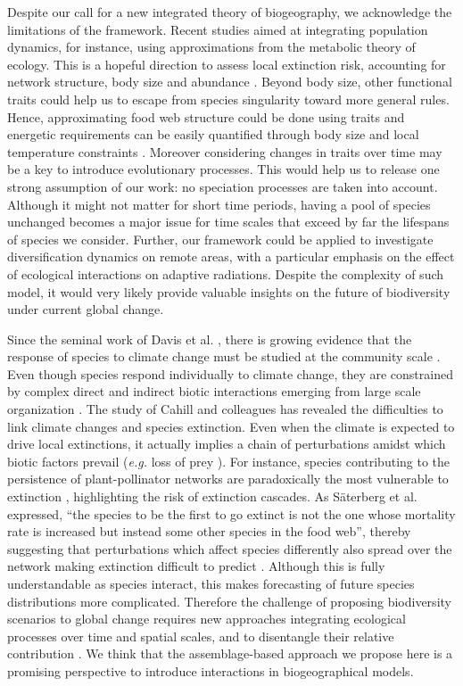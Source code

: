 Despite our call for a new integrated theory of biogeography, we acknowledge the limitations of the framework. Recent studies aimed at integrating population dynamics, for instance, using approximations from the metabolic theory of ecology. This is a hopeful direction to assess local extinction risk, accounting for network structure, body size and abundance \citep{Schneider2012Body}. Beyond body size, other functional traits \citep{Mcgill2006Rebuilding} could help us to escape from species singularity toward more general rules. Hence, approximating food web structure could be done using traits \citep{Gravel2013Inferring} and energetic requirements can be easily quantified through body size and local temperature constraints \citep{Brown2004Toward}. Moreover considering changes in traits over time may be a key to introduce evolutionary processes. This would help us to release one strong assumption of our work: no speciation processes are taken into account. Although it might not matter for short time periods, having a pool of species unchanged becomes a major issue for time scales that exceed by far the lifespans of species we consider. Further, our framework could be applied to investigate diversification dynamics on remote areas, with a particular emphasis on the effect of ecological interactions on adaptive radiations. Despite the complexity of such model, it would very likely provide valuable insights on the future of biodiversity under current global change.

Since the seminal work of Davis et al. \citep{Davis1998Making}, there is growing evidence that the response of species to climate change must be studied at the community scale \citep{Suttle2007Species}. Even though species respond individually to climate change, they are constrained by complex direct and indirect biotic interactions emerging from large scale organization \citep{Lavergne2010Biodiversity}. The study of Cahill and colleagues \citep{Cahill2013How} has revealed the difficulties to link climate changes and species extinction. Even when the climate is expected to drive local extinctions, it actually implies a chain of perturbations amidst which biotic factors prevail (\textit{e.g.} loss of prey \citep{Durance2010Evidence}). For instance, species contributing to the persistence of plant-pollinator networks are paradoxically the most vulnerable to extinction \citep{Saavedra2011Strong}, highlighting the risk of extinction cascades. As S\"aterberg et al. expressed, ``the species to be the first to go extinct is not the one whose mortality rate is increased but instead some other species in the food web'', thereby suggesting that perturbations which affect species differently also spread over the network making extinction difficult to predict \citep{Saeterberg2013High}. Although this is fully understandable as species interact, this makes forecasting of future species distributions more complicated. Therefore the challenge of proposing biodiversity scenarios to global change requires new approaches integrating ecological processes over time and spatial scales, and to disentangle their relative contribution \citep{Lavergne2010Biodiversity}. We think that the assemblage-based approach we propose here is a promising perspective to introduce interactions in biogeographical models.


